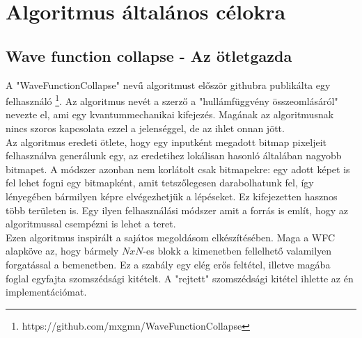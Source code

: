 \chapter{Algoritmus általános célokra}
\section{Wave function collapse - Az ötletgazda} \label{WFC-Otlet}
A "WaveFunctionCollapse" nevű algoritmust először githubra publikálta egy felhasználó \footnote{https://github.com/mxgmn/WaveFunctionCollapse}. Az algoritmus nevét a szerző a "hullámfüggvény összeomlásáról" nevezte el, ami egy kvantummechanikai kifejezés. Magának az algoritmusnak nincs szoros kapcsolata ezzel a jelenséggel, de az ihlet onnan jött.
\\Az algoritmus eredeti ötlete, hogy egy inputként megadott bitmap pixeljeit felhasználva generálunk egy, az eredetihez lokálisan hasonló általában nagyobb bitmapet. A módszer azonban nem korlátolt csak bitmapekre: egy adott képet is fel lehet fogni egy bitmapként, amit tetszőlegesen darabolhatunk fel, így lényegében bármilyen képre elvégezhetjük a lépéseket. Ez kifejezetten hasznos több területen is. Egy ilyen felhasználási módszer amit a forrás is említ, hogy az algoritmussal csempézni is lehet a teret.
\\Ezen algoritmus inspirált a sajátos megoldásom elkészítésében. Maga a WFC alapköve az, hogy bármely $NxN$-es blokk a kimenetben fellelhető valamilyen forgatással a bemenetben. Ez a szabály egy elég erős feltétel, illetve magába foglal egyfajta szomszédsági kitételt. A "rejtett" szomszédsági kitétel ihlette az én implementációmat.
